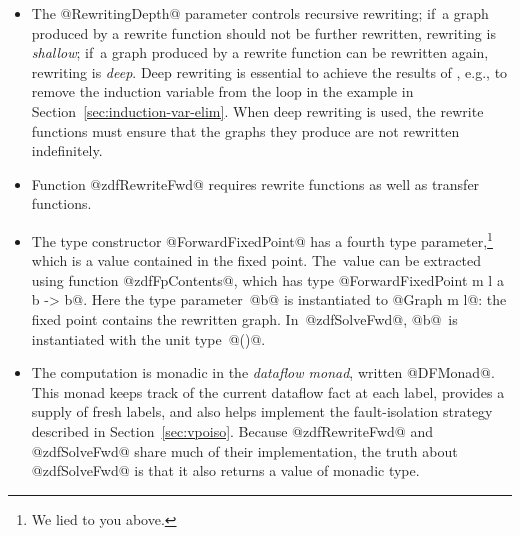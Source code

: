 \documentclass[blockstyle,preprint,natbib,nocopyrightspace]{sigplanconf}
\newcommand{\authornote}[1]{{\em #1}}
\def\authornote#1{\unskip\relax}
\newcommand{\simon}[1]{\authornote{SLPJ: #1}}
\newcommand\secref[1]{Section~\ref{sec:#1}}
\newcommand\seclabel[1]{\label{sec:#1}}
\begin{document}
\begin{itemize}
\item
The @RewritingDepth@ parameter controls recursive rewriting;
if~a graph produced by a rewrite function should not be further rewritten,
rewriting is \emph{shallow};
if~a graph produced by a rewrite function can be rewritten again,
rewriting is \emph{deep}.
Deep rewriting is essential to achieve the results of
\citet{lerner-grove-chambers:2002}, e.g., to remove the induction
variable from the loop in the example in \secref{induction-var-elim}.
When deep rewriting is used, the rewrite functions must
ensure that the graphs they produce are not rewritten indefinitely.
\item
Function @zdfRewriteFwd@ requires rewrite functions as well as transfer
functions.
\item
The type constructor @ForwardFixedPoint@ has a fourth
type parameter,\footnote
{We lied to you above.}
which is a value contained in the fixed point.
The~value can be extracted using function @zdfFpContents@, which has
type @ForwardFixedPoint m l a b -> b@.
Here the type parameter~@b@ is instantiated to @Graph m l@: the fixed point
contains the rewritten graph.
In~@zdfSolveFwd@, @b@~is instantiated with
the unit type~@()@.
\simon{We can't make this point until later, where we say that solve is
implemented using rewrite.}
\item
The computation is monadic in the \emph{dataflow monad}, written
@DFMonad@.
This monad keeps track of the current dataflow fact at each label,
provides a supply of fresh labels, 
and
also helps implement the fault-isolation strategy described
in \secref{vpoiso}.
Because @zdfRewriteFwd@ and @zdfSolveFwd@ share much of their
implementation, the truth 
about @zdfSolveFwd@ is that it also returns a value of monadic type.
\simon{We should postpone this too.  And in any case we don't need to
expose it to the client, if it is a mere implementation matter, do we?}
\end{itemize}


\seclabel{dfengine-spec}
\end{document}
